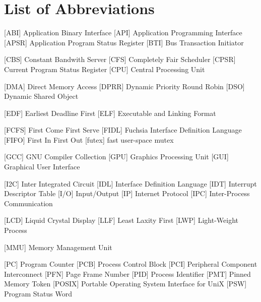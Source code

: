 
\chapter*{List of Abbreviations}

\begin{acronym} [POSIX]
 [ABI] {Application Binary Interface}
 [API] {Application Programming Interface}
 [APSR] {Application Program Status Register}
 [BTI] {Bus Transaction Initiator}

 [CBS] {Constant Bandwith Server}
 [CFS] {Completely Fair Scheduler}
 [CPSR] {Current Program Status Register}
 [CPU] {Central Processing Unit}

 [DMA] {Direct Memory Access}
 [DPRR] {Dynamic Priority Round Robin}
 [DSO] {Dynamic Shared Object}

 [EDF] {Earliest Deadline First}
 [ELF] {Executable and Linking Format}

 [FCFS] {First Come First Serve}
 [FIDL] {Fuchsia Interface Definition Language}
 [FIFO] {First In First Out}
 [futex] {fast user-space mutex}

 [GCC] {GNU Compiler Collection}
 [GPU] {Graphics Processing Unit}
 [GUI] {Graphical User Interface}


 [I2C] {Inter Integrated Circuit}
 [IDL] {Interface Definition Language}
 [IDT] {Interrupt Descriptor Table}
 [I/O] {Input/Output}
 [IP] {Internet Protocol}
[IPC] {Inter-Process Communication}



 [LCD] {Liquid Crystal Display}
 [LLF] {Least Laxity First}
 [LWP] {Light-Weight Process}

 [MMU] {Memory Management Unit}



 [PC] {Program Counter}
 [PCB] {Process Control Block}
 [PCI] {Peripheral Component Interconnect}
 [PFN] {Page Frame Number}
 [PID] {Process Identifier}
 [PMT] {Pinned Memory Token}
 [POSIX] {Portable Operating System Interface for UniX}
 [PSW] {Program Status Word}


\end{acronym}
